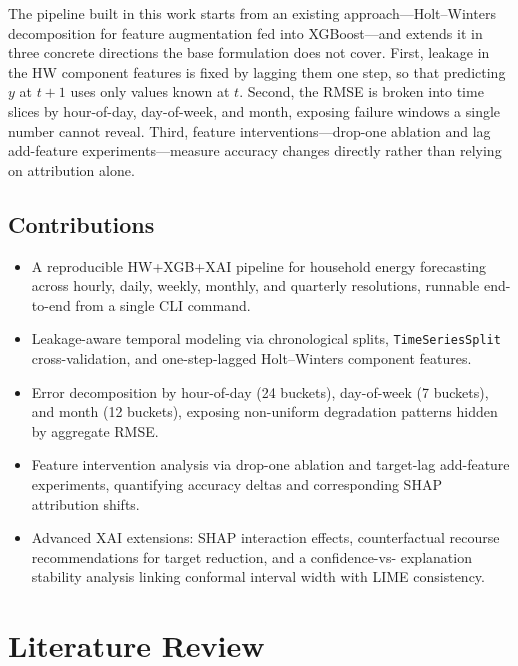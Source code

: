 \documentclass[10pt,twocolumn,letterpaper]{article}
\begin{document}
The pipeline built in this work starts from an existing
approach---Holt--Winters decomposition for feature augmentation fed into
XGBoost---and extends it in three concrete directions the base
formulation does not cover. First, leakage in the HW component features
is fixed by lagging them one step, so that predicting $y$ at $t{+}1$
uses only values known at $t$. Second, the RMSE is broken into time
slices by hour-of-day, day-of-week, and month, exposing failure windows
a single number cannot reveal. Third, feature interventions---drop-one
ablation and lag add-feature experiments---measure accuracy changes
directly rather than relying on attribution alone.

\subsection{Contributions}

\begin{itemize}[leftmargin=1.5em, itemsep=2pt, topsep=3pt]
  \item A reproducible HW+XGB+XAI pipeline for household energy
    forecasting across hourly, daily, weekly, monthly, and quarterly
    resolutions, runnable end-to-end from a single CLI command.
  \item Leakage-aware temporal modeling via chronological splits,
    \texttt{TimeSeriesSplit} cross-validation, and one-step-lagged
    Holt--Winters component features.
  \item Error decomposition by hour-of-day (24 buckets), day-of-week
    (7 buckets), and month (12 buckets), exposing non-uniform
    degradation patterns hidden by aggregate RMSE.
  \item Feature intervention analysis via drop-one ablation and
    target-lag add-feature experiments, quantifying accuracy deltas and
    corresponding SHAP attribution shifts.
  \item Advanced XAI extensions: SHAP interaction effects, counterfactual
    recourse recommendations for target reduction, and a confidence-vs-
    explanation stability analysis linking conformal interval width with
    LIME consistency.
\end{itemize}

\section{Literature Review}
\end{document}
